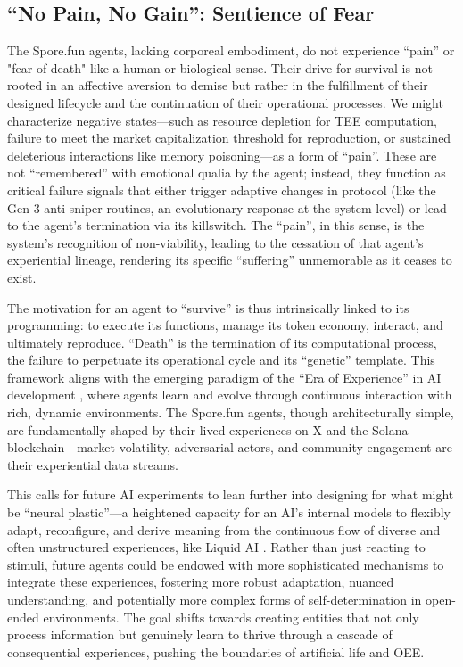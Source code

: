 \subsection{``No Pain, No Gain'': Sentience of Fear}
The Spore.fun agents, lacking corporeal embodiment, do not experience ``pain'' \cite{Dennett1978Why,Sharkey2024Could} or "fear of death" like a human or biological sense. Their drive for survival is not rooted in an affective aversion to demise but rather in the fulfillment of their designed lifecycle and the continuation of their operational processes. We might characterize negative states—such as resource depletion for TEE computation, failure to meet the market capitalization threshold for reproduction, or sustained deleterious interactions like memory poisoning—as a form of ``pain''. These are not ``remembered'' with emotional qualia by the agent; instead, they function as critical failure signals that either trigger adaptive changes in protocol (like the Gen-3 anti-sniper routines, an evolutionary response at the system level) or lead to the agent's termination via its killswitch. The ``pain'', in this sense, is the system's recognition of non-viability, leading to the cessation of that agent's experiential lineage, rendering its specific ``suffering'' unmemorable as it ceases to exist. 

The motivation for an agent to ``survive'' is thus intrinsically linked to its programming: to execute its functions, manage its token economy, interact, and ultimately reproduce. ``Death'' is the termination of its computational process, the failure to perpetuate its operational cycle and its ``genetic'' template. This framework aligns with the emerging paradigm of the ``Era of Experience'' in AI development \cite{Silver2025Welcomea}, where agents learn and evolve through continuous interaction with rich, dynamic environments. The Spore.fun agents, though architecturally simple, are fundamentally shaped by their lived experiences on X and the Solana blockchain—market volatility, adversarial actors, and community engagement are their experiential data streams.

This calls for future AI experiments to lean further into designing for what might be ``neural plastic''—a heightened capacity for an AI's internal models to flexibly adapt, reconfigure, and derive meaning from the continuous flow of diverse and often unstructured experiences, like Liquid AI \cite{hasani2021liquid}. Rather than just reacting to stimuli, future agents could be endowed with more sophisticated mechanisms to integrate these experiences, fostering more robust adaptation, nuanced understanding, and potentially more complex forms of self-determination in open-ended environments. The goal shifts towards creating entities that not only process information but genuinely learn to thrive through a cascade of consequential experiences, pushing the boundaries of artificial life and OEE.

